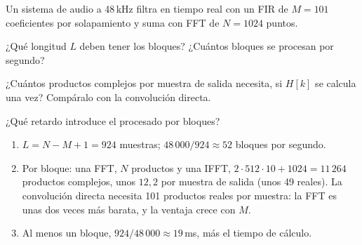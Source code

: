 \documentclass[11pt,a4paper]{scrartcl}
\begin{document}
\begin{ejercicio}
  Un sistema de audio a 48\,kHz filtra en tiempo real con un FIR de $M=101$ coeficientes por solapamiento y suma con FFT de $N=1024$ puntos.
  \begin{incisos}[1]
    \item ¿Qué longitud $L$ deben tener los bloques? ¿Cuántos bloques se procesan por segundo?
    \item ¿Cuántos productos complejos por muestra de salida necesita, si $H[k]$ se calcula una vez? Compáralo con la convolución directa.
    \item ¿Qué retardo introduce el procesado por bloques?
  \end{incisos}
\end{ejercicio}
\begin{solucion}
  \begin{enumerate}[label=\alph*)]
    \item $L=N-M+1=924$ muestras; $48\,000/924\approx52$ bloques por segundo.
    \item Por bloque: una FFT, $N$ productos y una IFFT, $2\cdot512\cdot10+1024=11\,264$ productos complejos, unos $12{,}2$ por muestra de salida (unos 49 reales). La convolución directa necesita 101 productos reales por muestra: la FFT es unas dos veces más barata, y la ventaja crece con $M$.
    \item Al menos un bloque, $924/48\,000\approx19$\,ms, más el tiempo de cálculo.
  \end{enumerate}
\end{solucion}
\end{document}
